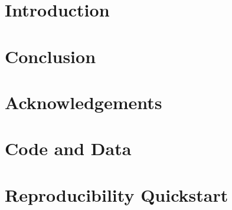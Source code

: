\documentclass[12pt, letterpaper]{article}
\begin{document}
\section{Introduction}



\section{Conclusion}


\section*{Acknowledgements}


\appendix

\section{Code and Data}


\section{Reproducibility Quickstart}




\end{document}
